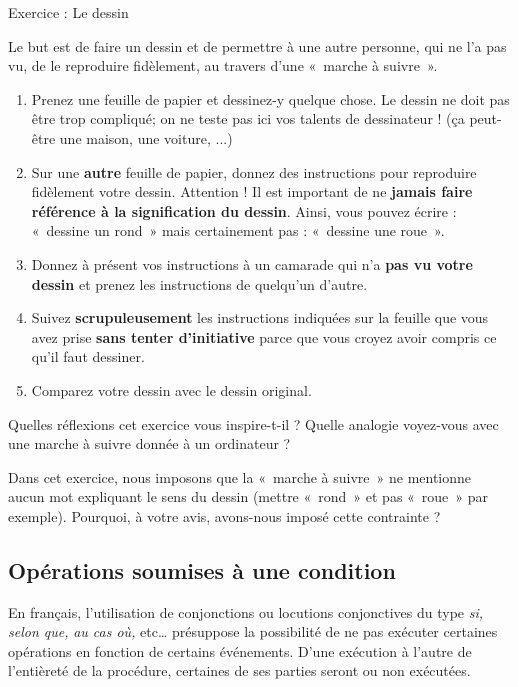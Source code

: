 		\begin{Emphase}[exercice]{Exercice : Le dessin}

			Le but est de faire un dessin et de permettre à une autre personne, qui
			ne l'a pas vu, de le reproduire fidèlement, au travers
			d'une «~marche à suivre~».

			\begin{enumerate}
			\item
				Prenez une feuille de papier et dessinez-y quelque chose. 
				Le dessin ne doit pas être trop compliqué; 
				on ne teste pas ici vos talents de dessinateur ! 
				(ça peut-être une maison, une voiture, ...)
			\item
				Sur une \textbf{autre} feuille de papier, 
				donnez des instructions pour
				reproduire fidèlement votre dessin. 
				Attention ! Il est important de ne
				\textbf{jamais faire référence à la signification du dessin}. 
				Ainsi, vous pouvez écrire : «~dessine un rond~» 
				mais certainement pas : «~dessine une roue~».
			\item
				Donnez à présent vos instructions à un camarade qui n'a
				\textbf{pas vu votre dessin} et prenez les instructions de
				quelqu'un d'autre.
			\item
				Suivez \textbf{scrupuleusement} les instructions indiquées sur la
				feuille que vous avez prise \textbf{sans tenter
				d'initiative} parce que vous croyez avoir compris ce
				qu'il faut dessiner.
			\item
				Comparez votre dessin avec le dessin original.
			\end{enumerate}

		\end{Emphase}

\bigskip
		Quelles réflexions cet exercice vous inspire-t-il ?
		Quelle analogie voyez-vous avec une marche à suivre donnée à un
		ordinateur ?

		Dans cet exercice, nous imposons que la «~marche à suivre~» ne mentionne
		aucun mot expliquant le sens du dessin (mettre «~rond~» et pas «~roue~»
		par exemple). Pourquoi, à votre avis, avons-nous imposé cette
		contrainte ?

	\subsection{Opérations soumises à une condition}

		En français, l’utilisation de conjonctions ou locutions conjonctives du
		type \textit{si}\textit{, selon que, }\textit{au cas où, }etc…
		présuppose la possibilité de ne pas exécuter certaines opérations en
		fonction de certains événements. D’une exécution à l’autre de
		l’entièreté de la procédure, certaines de ses parties seront ou non
		exécutées.

